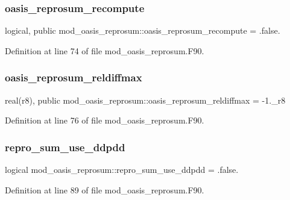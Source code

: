 \subsubsection{\texorpdfstring{oasis\+\_\+reprosum\+\_\+recompute}{oasis\_reprosum\_recompute}}
{\footnotesize\ttfamily logical, public mod\+\_\+oasis\+\_\+reprosum\+::oasis\+\_\+reprosum\+\_\+recompute = .false.}



Definition at line 74 of file mod\+\_\+oasis\+\_\+reprosum.\+F90.

\mbox{\label{namespacemod__oasis__reprosum_a6a80f4226d35d0842617e6eb6c9406e1}} 
\subsubsection{\texorpdfstring{oasis\+\_\+reprosum\+\_\+reldiffmax}{oasis\_reprosum\_reldiffmax}}
{\footnotesize\ttfamily real(r8), public mod\+\_\+oasis\+\_\+reprosum\+::oasis\+\_\+reprosum\+\_\+reldiffmax = -\/1.\+\_\+r8}



Definition at line 76 of file mod\+\_\+oasis\+\_\+reprosum.\+F90.

\mbox{\label{namespacemod__oasis__reprosum_aab06d0de9a82726d347ac52bb276355d}} 
\subsubsection{\texorpdfstring{repro\+\_\+sum\+\_\+use\+\_\+ddpdd}{repro\_sum\_use\_ddpdd}}
{\footnotesize\ttfamily logical mod\+\_\+oasis\+\_\+reprosum\+::repro\+\_\+sum\+\_\+use\+\_\+ddpdd = .false.\hspace{0.3cm}{\ttfamily [private]}}



Definition at line 89 of file mod\+\_\+oasis\+\_\+reprosum.\+F90.

